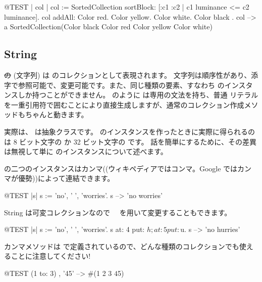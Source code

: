 \documentclass[a4paper,10pt,twoside]{book}
\begin{document}
\begin{code}{@TEST | col |}
col := SortedCollection sortBlock: [:c1 :c2 | c1 luminance <= c2 luminance].
col addAll: { Color red. Color yellow. Color white. Color black }.
col --> a SortedCollection(Color black Color red Color yellow Color white)
\end{code}

\subsection{String}
\st の  (文字列) は  のコレクションとして表現されます。
文字列は順序性があり、添字で参照可能で、変更可能です。また、同じ種類の要素、すなわち  のインスタンスしか持つことができません。
 のように は専用の文法を持ち、普通  リテラルを一重引用符で囲むことにより直接生成しますが、通常のコレクション作成メソッドもちゃんと動きます。


実際は、 は抽象クラスです。
 のインスタンスを作ったときに実際に得られるのは 8 ビット文字の  か 32 ビット文字の  です。
話を簡単にするために、その差異は無視して単に  のインスタンスについて述べます。

 の二つのインスタンスはカンマ((ウィキペディアではコンマ。Google ではカンマが優勢))によって連結できます。
\begin{code}{@TEST |s|}
s := 'no', ' ', 'worries'.
s -->  'no worries'
\end{code}

String は可変コレクションなので　 を用いて変更することもできます。

\begin{code}{@TEST |s| s := 'no', ' ', 'worries'.}
s at: 4 put: $h; at: 5 put: $u.
s --> 'no hurries'
\end{code}

カンマメソッドは  で定義されているので、どんな種類のコレクションでも使えることに注意してください!
\begin{code}{@TEST}
(1 to: 3) , '45' --> #(1 2 3 $4 $5)
\end{code}
\end{document}
